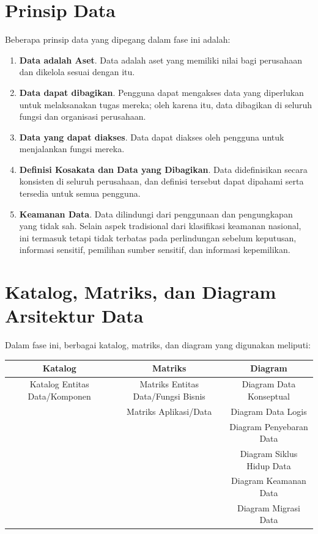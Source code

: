 \section{Prinsip Data}
Beberapa prinsip data yang dipegang dalam fase ini adalah:
\begin{enumerate}
	\item \textbf{Data adalah Aset}. Data adalah aset yang memiliki nilai bagi perusahaan dan dikelola sesuai dengan itu.
	\item \textbf{Data dapat dibagikan}. Pengguna dapat mengakses data yang diperlukan untuk melaksanakan tugas mereka; oleh karena itu, data dibagikan di seluruh fungsi dan organisasi perusahaan.
	\item \textbf{Data yang dapat diakses}. Data dapat diakses oleh pengguna untuk menjalankan fungsi mereka.
	\item \textbf{Definisi Kosakata dan Data yang Dibagikan}. Data didefinisikan secara konsisten di seluruh perusahaan, dan definisi tersebut dapat dipahami serta tersedia untuk semua pengguna.
	\item \textbf{Keamanan Data}. Data dilindungi dari penggunaan dan pengungkapan yang tidak sah. Selain aspek tradisional dari klasifikasi keamanan nasional, ini termasuk tetapi tidak terbatas pada perlindungan sebelum keputusan, informasi sensitif, pemilihan sumber sensitif, dan informasi kepemilikan.
\end{enumerate}

\section{Katalog, Matriks, dan Diagram Arsitektur Data}
Dalam fase ini, berbagai katalog, matriks, dan diagram yang digunakan meliputi:
\begin{table}[ht]
	\begin{tabular}{|c|c|c|}
		\hline
		\textbf{Katalog} & \textbf{Matriks} & \textbf{Diagram} \\ \hline
		Katalog Entitas Data/Komponen & Matriks Entitas Data/Fungsi Bisnis & Diagram Data Konseptual \\
		& Matriks Aplikasi/Data & Diagram Data Logis \\
		& & Diagram Penyebaran Data \\
		& & Diagram Siklus Hidup Data \\
		& & Diagram Keamanan Data \\
		& & Diagram Migrasi Data \\ \hline
	\end{tabular}
\end{table}


